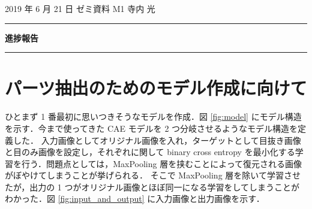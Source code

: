 \documentclass[onecolumn]{ujarticle}     %
\begin{document}
	
	
	\noindent
	
	\hspace{1em}
	2019 年 6 月 21 日
	ゼミ資料
	\hfill
	M1 寺内 光
	
	\vspace{2mm}
	
	\hrule
	
	\begin{center}
		{\Large \bf 進捗報告}
	\end{center}
	
	
	\hrule
	\vspace{3mm}
	
	\section{パーツ抽出のためのモデル作成に向けて}
	ひとまず 1 番最初に思いつきそうなモデルを作成．図 \ref{fig:model} にモデル構造を示す．今まで使ってきた CAE モデルを 2 つ分岐させるようなモデル構造を定義した．
	入力画像としてオリジナル画像を入れ，ターゲットとして目抜き画像と目のみ画像を設定し，それぞれに関して binary cross entropy を最小化する学習を行う．問題点としては，MaxPooling 層を挟むことによって復元される画像がぼやけてしまうことが挙げられる．
	そこで MaxPooling 層を除いて学習させたが，出力の 1 つがオリジナル画像とほぼ同一になる学習をしてしまうことがわかった．図 \ref{fig:input_and_output} に入力画像と出力画像を示す．
	
\end{document}
